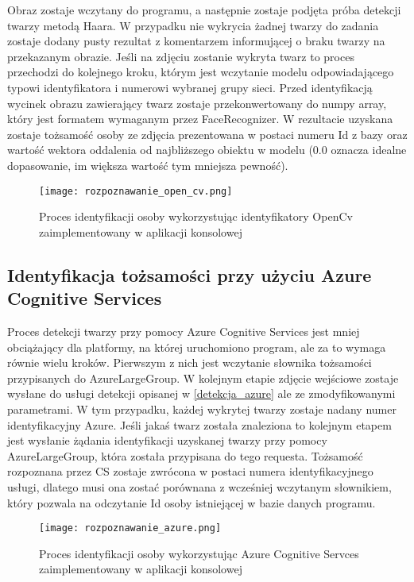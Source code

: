 Obraz zostaje wczytany do programu, a następnie zostaje podjęta próba detekcji twarzy metodą Haara. W przypadku nie wykrycia żadnej twarzy do zadania zostaje dodany pusty rezultat z komentarzem informującej o braku twarzy na przekazanym obrazie. 
Jeśli na zdjęciu zostanie wykryta twarz to proces przechodzi do kolejnego kroku, którym jest wczytanie modelu odpowiadającego typowi identyfikatora i numerowi wybranej grupy sieci. Przed identyfikacją wycinek obrazu zawierający twarz zostaje przekonwertowany do numpy array, który jest formatem wymaganym przez FaceRecognizer. W rezultacie uzyskana zostaje tożsamość osoby ze zdjęcia prezentowana w postaci numeru Id z bazy oraz wartość wektora oddalenia od najbliższego obiektu w modelu (0.0 oznacza idealne dopasowanie, im większa wartość tym mniejsza pewność). 
\begin{figure}[H]
	\centering
	\texttt{[image: rozpoznawanie\_open\_cv.png]}
	\caption{Proces identyfikacji osoby wykorzystując identyfikatory OpenCv zaimplementowany w aplikacji konsolowej}
	\label{fig:rozpoznawanie_open_cv}
\end{figure}

\subsection{Identyfikacja tożsamości przy użyciu Azure Cognitive Services}
Proces detekcji twarzy przy pomocy Azure Cognitive Services jest mniej obciążający dla platformy, na której uruchomiono program, ale za to wymaga równie wielu kroków. Pierwszym z nich jest wczytanie słownika tożsamości przypisanych do AzureLargeGroup. W kolejnym etapie zdjęcie wejściowe zostaje wysłane do usługi detekcji opisanej w \ref{detekcja_azure} ale ze zmodyfikowanymi parametrami. W tym przypadku, każdej wykrytej twarzy zostaje nadany numer identyfikacyjny Azure. Jeśli jakaś twarz została znaleziona to kolejnym etapem jest wysłanie żądania identyfikacji uzyskanej twarzy przy pomocy AzureLargeGroup, która została przypisana do tego requesta. Tożsamość rozpoznana przez CS zostaje zwrócona w postaci numera identyfikacyjnego usługi, dlatego musi ona zostać porównana z wcześniej wczytanym słownikiem, który pozwala na odczytanie Id osoby istniejącej w bazie danych programu.
\begin{figure}[H]
	\centering
	\texttt{[image: rozpoznawanie\_azure.png]}
	\caption{Proces identyfikacji osoby wykorzystując Azure Cognitive Servces zaimplementowany w aplikacji konsolowej}
	\label{fig:rozpoznawanie_azure}
\end{figure}
